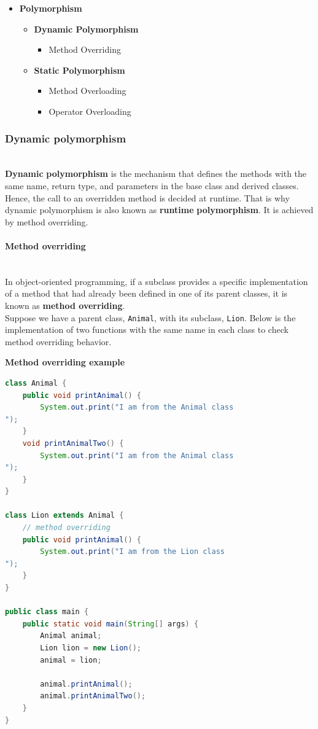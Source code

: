 \vspace{0.3cm}
\begin{itemize}
\item \textbf{Polymorphism}
\begin{itemize}
\item \textbf{Dynamic Polymorphism}
\begin{itemize}
\item Method Overriding
\end{itemize}
\end{itemize}
\begin{itemize}
\item \textbf{Static Polymorphism}
\begin{itemize}
\item Method Overloading
\item Operator Overloading
\end{itemize}
\end{itemize}
\end{itemize}

\subsubsection{Dynamic polymorphism}\label{-yDmGhFtFlxlNVvtRihGo-2}
\\
\textbf{Dynamic} \textbf{polymorphism} is the mechanism that defines the methods with the same name, return type, and parameters in the base class and derived classes. Hence, the call to an overridden method is decided at runtime. That is why dynamic polymorphism is also known as \textbf{runtime} \textbf{polymorphism}. It is achieved by method overriding.
\\
\paragraph{Method overriding}\label{7bkY7h9LjORzm16PusD4P}
\\
In object-oriented programming, if a subclass provides a specific implementation of a method that had already been defined in one of its parent classes, it is known as \textbf{method overriding}.
\\
Suppose we have a parent class, \texttt{Animal}, with its subclass, \texttt{Lion}. Below is the implementation of two functions with the same name in each class to check method overriding behavior.

\textbf{Method overriding example}

\begin{lstlisting}[language=Java]
class Animal {
	public void printAnimal() {
		System.out.print("I am from the Animal class
");
	}
	void printAnimalTwo() {
		System.out.print("I am from the Animal class
");
	}
}

class Lion extends Animal {
	// method overriding
	public void printAnimal() {
		System.out.print("I am from the Lion class
");
	}
}

public class main {
	public static void main(String[] args) {
		Animal animal;
		Lion lion = new Lion();
		animal = lion;

		animal.printAnimal();
		animal.printAnimalTwo();
	}
}
\end{lstlisting}


